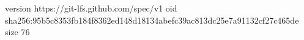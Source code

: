 version https://git-lfs.github.com/spec/v1
oid sha256:95b5c8353fb184f8362ed148d18134abefc39ac813dc25e7a91132cf27c465de
size 76
